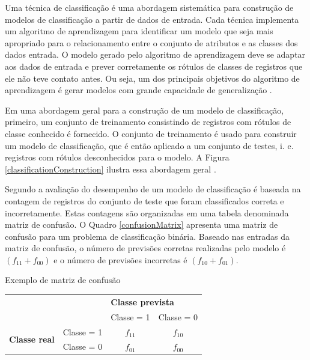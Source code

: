 Uma técnica de classificação é uma abordagem sistemática para construção de
modelos de classificação a partir de dados de entrada. Cada técnica implementa
um algoritmo de aprendizagem para identificar um modelo que seja mais apropriado
para o relacionamento entre o conjunto de atributos e as classes dos dados
entrada. O modelo gerado pelo algoritmo de aprendizagem deve se adaptar aos
dados de entrada e prever corretamente os rótulos de classes de registros que
ele não teve contato antes. Ou seja, um dos principais objetivos do algoritmo de
aprendizagem é gerar modelos com grande capacidade de generalização
\cite{tan2009introduccao}.

{}

Em uma abordagem geral para a construção de um modelo de classificação,
primeiro, um conjunto de treinamento consistindo de registros com rótulos de
classe conhecido é fornecido. O conjunto de treinamento é usado para construir
um modelo de classificação, que é então aplicado a um conjunto de testes, i. e.
registros com rótulos desconhecidos para o modelo. A Figura
\ref{classificationConstruction} ilustra essa abordagem geral
\cite{tan2009introduccao}.

Segundo  a avaliação do desempenho de um modelo
de classificação é baseada na contagem de registros do conjunto de teste que
foram classificados correta e incorretamente. Estas contagens são organizadas em
uma tabela denominada matriz de confusão. O Quadro \ref{confusionMatrix}
apresenta uma matriz de confusão para um problema de classificação binária.
Baseado nas entradas da matriz de confusão, o número de previsões corretas
realizadas pelo modelo é \((f_{11} + f_{00})\) e o número de previsões
incorretas é \((f_{10} + f_{01})\).

\begin{quadro}[]
  \centering
  \caption{Exemplo de matriz de confusão}
  \label{confusionMatrix}
  \begin{tabular}{ll|c|c|}
    \cline{3-4}
    \multicolumn{1}{c}{\textbf{}} & \multicolumn{1}{c|}{\textbf{}} & \multicolumn{2}{l|}{\textbf{Classe prevista}} \\ \cline{3-4}
    & \multicolumn{1}{c|}{\textbf{}} & Classe = 1 & Classe = 0 \\ \hline
    \multicolumn{1}{|l|}{\multirow{2}{*}{\textbf{Classe real}}} & Classe = 1 & $f_{11}$ & $f_{10}$ \\ \cline{2-4}
    \multicolumn{1}{|l|}{} & Classe = 0 & $f_{01}$ & $f_{00}$ \\ \hline
  \end{tabular}
  \Ididthis
\end{quadro}

